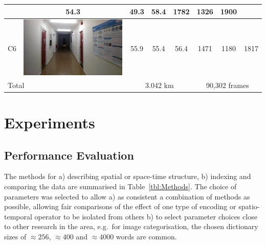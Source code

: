 \begin{table}[ht]
\begin{center}
\begin{tabular}{l c c c c c c c}
\begin{minipage}{.2\textwidth}
			   \end{minipage}
			        & 54.3  & 49.3 & 58.4 & 1782          & 1326 & 1900 \\ \hline
    C6       & \begin{minipage}{.2\textwidth}
      			\includegraphics[width=\linewidth]{./gfx/Chapter04/table/6.jpg}
			   \end{minipage}
			        & 55.9  & 55.4 & 56.4 & 1471          & 1180 & 1817 \\ \hline \hline
	\multicolumn{2}{l}{Total}      & \multicolumn{3}{c}{3.042 km} & \multicolumn{3}{c}{90,302 frames} \\ \hline
    \end{tabular}

\end{center}
\end{table}


\section{Experiments}
\label{sec:exp_methods}

\subsection{Performance Evaluation}

The methods for a) describing spatial or space-time structure, b) indexing and comparing the data are summarised in Table~\ref{tbl:Methods}. The choice of parameters was selected to allow a) as consistent a combination of methods as possible, allowing fair comparisons of the effect of one type of encoding or spatio-temporal operator to be isolated from others b) to select parameter choices close to other research in the area, e.g.\ for image categorisation, the chosen dictionary sizes of $\approx 256$, $\approx 400$ and $\approx 4000$ words are common. 

